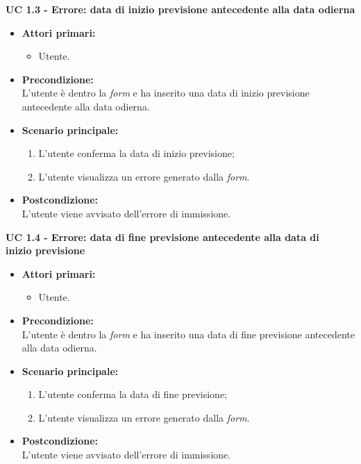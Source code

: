 \noindent \textbf{\large UC 1.3 - Errore: data di inizio previsione antecedente alla data odierna}
\label{uc:err-inserimento-data-inizio-prev}
\begin{itemize}

	\item \textbf{Attori primari: }
		\begin{itemize}
			\item Utente.
		\end{itemize}

	\item \textbf{Precondizione: }\\[0.3cm]
		L'utente è dentro la \textit{form} e ha inserito una data di inizio previsione antecedente
		alla data odierna.

	\item \textbf{Scenario principale: }
		\begin{enumerate}
			\item L'utente conferma la data di inizio previsione;
			\item L'utente visualizza un errore generato dalla \textit{form}.
		\end{enumerate}
		

	\item \textbf{Postcondizione: }\\[0.3cm]
		L'utente viene avvisato dell'errore di immissione.

\end{itemize}

\vspace{0.5cm}

\noindent \textbf{\large UC 1.4 - Errore: data di fine previsione antecedente alla data di \\\hspace*{56pt}inizio previsione}
\label{uc:err-inserimento-data-fine-prev}
\begin{itemize}

	\item \textbf{Attori primari: }
		\begin{itemize}
			\item Utente.
		\end{itemize}

	\item \textbf{Precondizione: }\\[0.3cm]
		L'utente è dentro la \textit{form} e ha inserito una data di fine previsione antecedente
		alla data odierna.

	\item \textbf{Scenario principale: }
		\begin{enumerate}
			\item L'utente conferma la data di fine previsione;
			\item L'utente visualizza un errore generato dalla \textit{form}.
		\end{enumerate}
		

	\item \textbf{Postcondizione: }\\[0.3cm]
		L'utente viene avvisato dell'errore di immissione.

\end{itemize}

